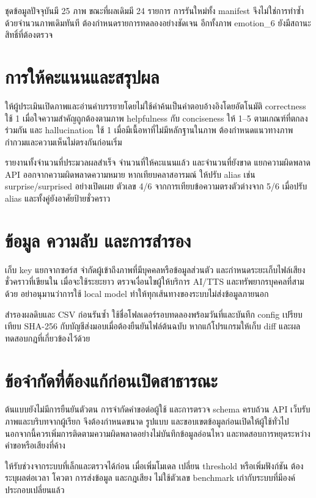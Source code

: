 ชุดข้อมูลปัจจุบันมี 25 ภาพ ขณะที่ผลเดิมมี 24 รายการ การรันใหม่ทั้ง manifest จึงไม่ใช่การทำซ้ำด้วยจำนวนภาพเดิมทันที ต้องกำหนดรายการทดลองอย่างชัดเจน อีกทั้งภาพ emotion\_6 ยังมีสถานะสิทธิ์ที่ต้องตรวจ

\section{การให้คะแนนและสรุปผล}
ให้ผู้ประเมินเปิดภาพและอ่านคำบรรยายโดยไม่ใช้คำค้นเป็นคำตอบอ้างอิงโดยอัตโนมัติ correctness ใช้ 1 เมื่อใจความสำคัญถูกต้องตามภาพ helpfulness กับ conciseness ให้ 1--5 ตามเกณฑ์ที่ตกลงร่วมกัน และ hallucination ใช้ 1 เมื่อมีเนื้อหาที่ไม่มีหลักฐานในภาพ ต้องกำหนดแนวทางภาพกำกวมและความเห็นไม่ตรงกันก่อนเริ่ม

รายงานทั้งจำนวนที่ประมวลผลสำเร็จ จำนวนที่ให้คะแนนแล้ว และจำนวนที่ยังขาด แยกความผิดพลาด API ออกจากความผิดพลาดความหมาย หากเทียบคลาสอารมณ์ ให้ปรับ alias เช่น surprise/surprised อย่างเปิดเผย ตัวเลข 4/6 จากการเทียบข้อความตรงตัวต่างจาก 5/6 เมื่อปรับ alias และทั้งคู่ยังอาศัยป้ายชั่วคราว

\section{ข้อมูล ความลับ และการสำรอง}
เก็บ key แยกจากซอร์ส จำกัดผู้เข้าถึงภาพที่มีบุคคลหรือข้อมูลส่วนตัว และกำหนดระยะเก็บไฟล์เสียงชั่วคราวที่เขียนใน  เมื่อจะใช้ระยะยาว ตรวจเงื่อนไขผู้ให้บริการ AI/TTS และทรัพยากรบุคคลที่สามด้วย อย่าอนุมานว่าการใช้ local model ทำให้ทุกเส้นทางของระบบไม่ส่งข้อมูลภายนอก

สำรองผลดิบและ CSV ก่อนรันซ้ำ ใช้ชื่อโฟลเดอร์รอบทดลองพร้อมวันที่และบันทึก config เปรียบเทียบ SHA-256 กับบัญชีส่งมอบเมื่อต้องยืนยันไฟล์ต้นฉบับ หากแก้โปรแกรมให้เก็บ diff และผลทดสอบกฎที่เกี่ยวข้องไว้ด้วย

\section{ข้อจำกัดที่ต้องแก้ก่อนเปิดสาธารณะ}
ต้นแบบยังไม่มีการยืนยันตัวตน การจำกัดคำขอต่อผู้ใช้ และการตรวจ schema ครบถ้วน API เว็บรับภาพและบริบทจากผู้เรียก จึงต้องกำหนดขนาด รูปแบบ และขอบเขตข้อมูลก่อนเปิดให้ผู้ใช้ทั่วไป นอกจากนี้ควรเพิ่มการติดตามความผิดพลาดอย่างไม่บันทึกข้อมูลอ่อนไหว และทดสอบการหยุดระหว่างคำขอหรือเสียงที่ค้าง

ให้รับช่วงจากระบบที่เล็กและตรวจได้ก่อน เมื่อเพิ่มโมเดล เปลี่ยน threshold หรือเพิ่มฟังก์ชัน ต้องระบุผลต่อเวลา โควตา การส่งข้อมูล และกฎเสียง ไม่ใช้ตัวเลข benchmark เก่ากับระบบที่มีองค์ประกอบเปลี่ยนแล้ว

